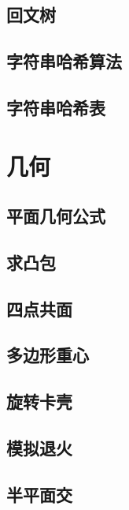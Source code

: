 \section{回文树}
\raggedbottom
\hrulefill
\section{字符串哈希算法}
\raggedbottom
\hrulefill
\section{字符串哈希表}
\raggedbottom
\hrulefill

\chapter{几何}
\section{平面几何公式}
\raggedbottom
\hrulefill
\section{求凸包}
\raggedbottom
\hrulefill
\section{四点共面}
\raggedbottom
\hrulefill
\section{多边形重心}
\raggedbottom
\hrulefill
\section{旋转卡壳}
\raggedbottom
\hrulefill
\section{模拟退火}
\raggedbottom
\hrulefill
\section{半平面交}
\raggedbottom
\hrulefill
